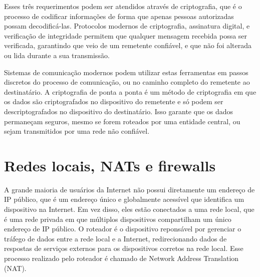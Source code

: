 


Esses três requerimentos podem ser atendidos através de criptografia, que é o processo de codificar informações de forma que apenas pessoas autorizadas possam decodificá-las. Protocolos modernos de criptografia, assinatura digital, e verificação de integridade permitem que qualquer mensagem recebida possa ser verificada, garantindo que veio de um remetente confiável, e que não foi alterada ou lida durante a sua transmissão.

Sistemas de comunicação modernos podem utilizar estas ferramentas em passos discretos do processo de comunicação, ou no caminho completo do remetente ao destinatário. A criptografia de ponta a ponta é um método de criptografia em que os dados são criptografados no dispositivo do remetente e só podem ser descriptografados no dispositivo do destinatário. Isso garante que os dados permaneçam seguros, mesmo se forem roteados por uma entidade central, ou sejam transmitidos por uma rede não confiável.

\section {Redes locais, NATs e firewalls}

A grande maioria de usuários da Internet não possui diretamente um endereço de IP público, que é um endereço único e globalmente acessível que identifica um dispositivo na Internet. Em vez disso, eles estão conectados a uma rede local, que é uma rede privada em que múltiplos dispositivos compartilham um único endereço de IP público. O roteador é o dispositivo reponsável por gerenciar o tráfego de dados entre a rede local e a Internet, redirecionando dados de respostas de serviços externos para os dispositivos corretos na rede local. Esse processo realizado pelo roteador é chamado de Network Address Translation (NAT).

